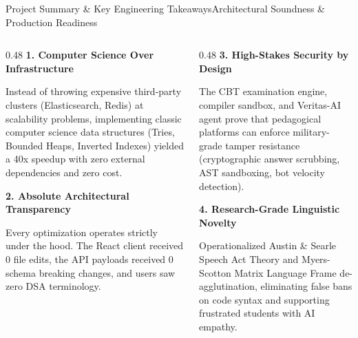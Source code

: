 \documentclass[aspectratio=169,10pt]{beamer}
\begin{document}
\begin{frame}[t]{Project Summary \& Key Engineering Takeaways}{Architectural Soundness \& Production Readiness}
  \begin{columns}[t]
    \begin{column}{0.48\textwidth}
      {\fontsize{9.0}{11.0}\selectfont\textbf{\textcolor{KoinexaRed}{1. Computer Science Over Infrastructure}}}\par\vspace{1.5pt}
      {\fontsize{8.0}{9.8}\selectfont Instead of throwing expensive third-party clusters (Elasticsearch, Redis) at scalability problems, implementing classic computer science data structures (Tries, Bounded Heaps, Inverted Indexes) yielded a 40x speedup with zero external dependencies and zero cost.}\par
      \vspace{0.2cm}
      {\fontsize{9.0}{11.0}\selectfont\textbf{\textcolor{KoinexaOrange}{2. Absolute Architectural Transparency}}}\par\vspace{1.5pt}
      {\fontsize{8.0}{9.8}\selectfont Every optimization operates strictly under the hood. The React client received 0 file edits, the API payloads received 0 schema breaking changes, and users saw zero DSA terminology.}
    \end{column}
    \begin{column}{0.48\textwidth}
      {\fontsize{9.0}{11.0}\selectfont\textbf{\textcolor{KoinexaRed}{3. High-Stakes Security by Design}}}\par\vspace{1.5pt}
      {\fontsize{8.0}{9.8}\selectfont The CBT examination engine, compiler sandbox, and Veritas-AI agent prove that pedagogical platforms can enforce military-grade tamper resistance (cryptographic answer scrubbing, AST sandboxing, bot velocity detection).}\par
      \vspace{0.2cm}
      {\fontsize{9.0}{11.0}\selectfont\textbf{\textcolor{KoinexaOrange}{4. Research-Grade Linguistic Novelty}}}\par\vspace{1.5pt}
      {\fontsize{8.0}{9.8}\selectfont Operationalized Austin \& Searle Speech Act Theory and Myers-Scotton Matrix Language Frame de-agglutination, eliminating false bans on code syntax and supporting frustrated students with AI empathy.}
    \end{column}
  \end{columns}
\end{frame}
\end{document}
